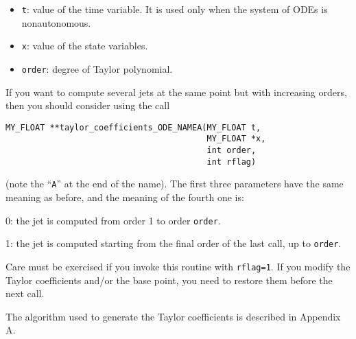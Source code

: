 \documentclass{article}
\begin{document}
{\vspace{3mm}
\begin{itemize}
\item{\verb+t+: value of the time variable. It is used only
when the system of ODEs is nonautonomous.}
\item{\verb+x+: value of the state variables.}
\item{\verb+order+: degree of Taylor polynomial.}
\end{itemize}

If you want to compute several jets at the same point but with
increasing orders, then you should consider using the call
\begin{verbatim}
MY_FLOAT **taylor_coefficients_ODE_NAMEA(MY_FLOAT t,
                                         MY_FLOAT *x,
                                         int order,
                                         int rflag)
\end{verbatim}
(note the ``{\tt A}'' at the end of the name). The first three
parameters have the same meaning as before, and the meaning of the
fourth one is:
\begin{description}
\item 0: the jet is computed from order 1 to order {\tt order}.
\item 1: the jet is computed starting from the final order of the last call,
up to {\tt order}.
\end{description}

Care must be exercised if you invoke this routine with {\tt rflag=1}.
If you modify the Taylor coefficients and/or the base point, you need
to restore them before the next call.

The algorithm used to generate the Taylor coefficients is described in
Appendix A.


}
\end{document}
